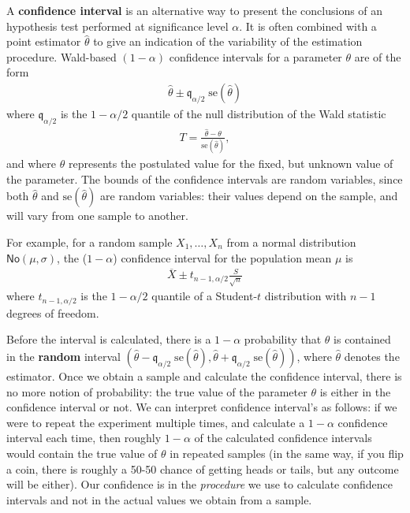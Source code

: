 \documentclass[
  11pt,
  letterpaper,
]{book}
\theoremstyle{definition}
\theoremstyle{definition}
\theoremstyle{definition}
\theoremstyle{definition}
\theoremstyle{remark}
\begin{document}
A \textbf{confidence interval} is an alternative way to present the conclusions of an hypothesis test performed at significance level \(\alpha\). It is often combined with a point estimator \(\hat{\theta}\) to give an indication of the variability of the estimation procedure. Wald-based \((1-\alpha)\) confidence intervals for a parameter \(\theta\) are of the form
\begin{align*}
\widehat{\theta} \pm \mathfrak{q}_{\alpha/2} \; \mathrm{se}(\widehat{\theta})
\end{align*}
where \(\mathfrak{q}_{\alpha/2}\) is the \(1-\alpha/2\) quantile of the null distribution of the Wald statistic
\begin{align*}
T =\frac{\widehat{\theta}-\theta}{\mathrm{se}(\widehat{\theta})},
\end{align*}
and where \(\theta\) represents the postulated value for the fixed, but unknown value of the parameter. The bounds of the confidence intervals are random variables, since both \(\widehat{\theta}\) and \(\mathrm{se}(\widehat{\theta})\) are random variables: their values depend on the sample, and will vary from one sample to another.

For example, for a random sample \(X_1, \ldots, X_n\) from a normal distribution \(\mathsf{No}(\mu, \sigma)\), the (\(1-\alpha\)) confidence interval for the population mean \(\mu\) is
\begin{align*}
\overline{X} \pm t_{n-1, \alpha/2} \frac{S}{\sqrt{n}}
\end{align*}
where \(t_{n-1,\alpha/2}\) is the \(1-\alpha/2\) quantile of a Student-\(t\) distribution with \(n-1\) degrees of freedom.

Before the interval is calculated, there is a \(1-\alpha\) probability that \(\theta\) is contained in the \textbf{random} interval \((\widehat{\theta} - \mathfrak{q}_{\alpha/2} \; \mathrm{se}(\widehat{\theta}), \widehat{\theta} + \mathfrak{q}_{\alpha/2} \; \mathrm{se}(\widehat{\theta}))\), where \(\widehat{\theta}\) denotes the estimator. Once we obtain a sample and calculate the confidence interval, there is no more notion of probability: the true value of the parameter \(\theta\) is either in the confidence interval or not. We can interpret confidence interval's as follows: if we were to repeat the experiment multiple times, and calculate a \(1-\alpha\) confidence interval each time, then roughly \(1-\alpha\) of the calculated confidence intervals would contain the true value of \(\theta\) in repeated samples (in the same way, if you flip a coin, there is roughly a 50-50 chance of getting heads or tails, but any outcome will be either). Our confidence is in the \emph{procedure} we use to calculate confidence intervals and not in the actual values we obtain from a sample.
\end{document}

